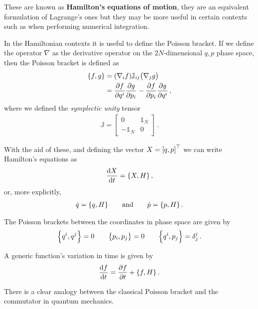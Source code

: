 \documentclass[main.tex]{subfiles}
\begin{document}
These are known as \textbf{Hamilton's equations of motion}, they are an equivalent formulation of Lagrange's ones but they may be more useful in certain contexts such as when performing numerical integration.

In the Hamiltonian contexts it is useful to define the Poisson bracket. 
If we define the operator \(\nabla\) as the derivative operator on the \(2N\)-dimensional \(q, p\) phase space, then the Poisson bracket is defined as 
%
\begin{align}
\qty{f, g} &= \qty(\nabla_{i} f) \mathbb{J}_{ij} \qty(\nabla_{j} g)  \\
&= \pdv{f}{q^{i}} \pdv{g}{p_{i}}
- \pdv{f}{p_{i}} \pdv{g}{q^{i}}
\,,
\end{align}
%
where we defined the \emph{symplectic unity} tensor 
%
\begin{align}
\mathbb{J} = \left[\begin{array}{cc}
0 & \mathbb{1}_{N} \\ 
-\mathbb{1}_{N} & 0 
\end{array}\right]
\,.
\end{align}

With the aid of these, and defining the vector \(X = \qty[q, p]^{\top}\) we can write Hamilton's equations as 
%
\begin{align}
\dv{X}{t} = \qty{X, H}
\,,
\end{align}
%
or, more explicitly, 
%
\begin{align}
\dot{q} = \qty{q, H}
\qquad \text{and} \qquad
\dot{p} = \qty{p, H}
\,.
\end{align}

The Poisson brackets between the coordinates in phase space are given by 
%
\begin{align}
\qty{q^{i}, q^{j}} = 0
 \qquad
\qty{p_{i}, p_{j}} = 0
\qquad 
\qty{q^{i}, p_{j}} = \delta^{i}_{j}
\,.
\end{align}

A generic function's variation in time is given by 
%
\begin{align}
\dv{f}{t} = \pdv{f}{t} + \qty{f, H}
\,.
\end{align}

There is a clear analogy between the classical Poisson bracket and the commutator in quantum mechanics.
\end{document}
